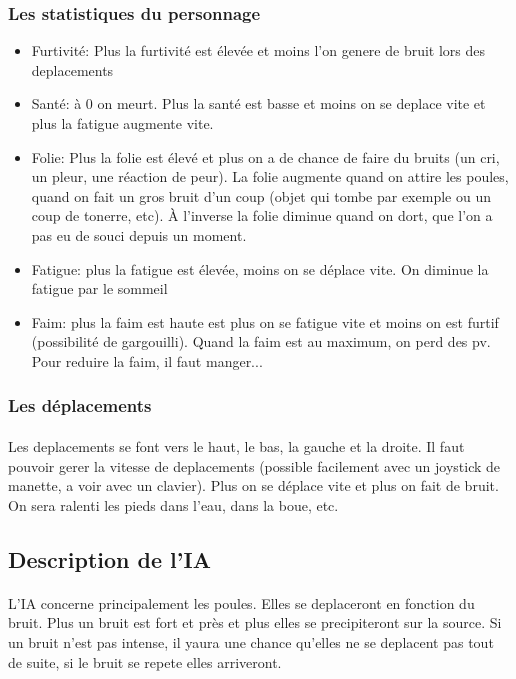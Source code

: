 \documentclass[a4paper,10pt]{article}
\begin{document}
		\subsubsection{Les statistiques du personnage}
			\begin{itemize}
				\item Furtivité: Plus la furtivité est élevée et moins l'on 
genere de bruit lors des deplacements
				\item Santé: à 0 on meurt. Plus la santé est basse et moins on 
se deplace vite et plus la fatigue augmente vite.
				\item Folie: Plus la folie est élevé et plus on a de chance de 
faire du bruits (un cri, un pleur, une réaction de peur). La folie augmente 
quand 
on attire les poules, quand on fait un gros bruit d'un coup (objet qui tombe 
par exemple ou un coup de tonerre, etc). À l'inverse la folie diminue quand 
on dort, que l'on a pas eu de souci depuis un moment.
				\item Fatigue: plus la fatigue est élevée, moins on se déplace 
vite. On diminue la fatigue par le sommeil
				\item Faim: plus la faim est haute est plus on se fatigue vite 
et moins on est furtif (possibilité de gargouilli). Quand la faim est au 
maximum, on perd des pv. Pour reduire la faim, il faut manger...
			\end{itemize}

		\subsubsection{Les déplacements}
			\paragraph{} Les deplacements se font vers le haut, le bas, la 
gauche et la droite. Il faut pouvoir gerer la vitesse de deplacements (possible 
facilement avec un joystick de manette, a voir avec un clavier). Plus on se 
déplace vite et plus on fait de bruit. On sera ralenti les pieds dans 
l'eau, 	dans la boue, etc.

		\subsection{Description de l'IA}
			\paragraph{} L'IA concerne principalement les poules. Elles se 
deplaceront en fonction du bruit. Plus un bruit est fort et près et plus elles 
se precipiteront sur la source. Si un bruit n'est pas intense, il yaura une 
chance qu'elles ne se deplacent pas tout de suite, si le bruit se repete elles 
arriveront.
\end{document}
